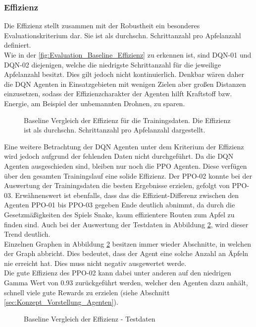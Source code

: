 \subsubsection{Effizienz} \label{sec:Evaluation_Effizienz_Baseline}
Die Effizienz stellt zusammen mit der Robustheit ein besonderes Evaluationskriterium dar. Sie ist als durchschn. Schrittanzahl pro Apfelanzahl definiert.\\
Wie in der \autoref{fig:Evaluation_Baseline_Effizienz} zu erkennen ist, sind DQN-01 und DQN-02 diejenigen, welche die niedrigste Schrittanzahl für die jeweilige Apfelanzahl besitzt. Dies gilt jedoch nicht kontinuierlich. Denkbar wären daher die DQN Agenten in Einsatzgebieten mit wenigen Zielen aber großen Distanzen einzusetzen, sodass der Effizienzcharakter der Agenten hilft Kraftstoff bzw. Energie, am Beispiel der unbemannten Drohnen, zu sparen. 
\begin{figure}[H]
	\centering
	
	\caption[Baseline Vergleich der Effizienz für die Trainingsdaten]{Baseline Vergleich der Effizienz für die Trainingsdaten. Die Effizienz ist als durchschn. Schrittanzahl pro Apfelanzahl dargestellt.}
	\label{fig:Evaluation_Baseline_Effizienz}
\end{figure}
Eine weitere Betrachtung der DQN Agenten unter dem Kriterium der Effizienz wird jedoch aufgrund der fehlenden Daten nicht durchgeführt.
Da die DQN Agenten ausgeschieden sind, bleiben nur noch die PPO Agenten. Diese verfügen über den gesamten Trainingslauf eine solide Effizienz.
Der PPO-02 konnte bei der Auswertung der Trainingsdaten die besten Ergebnisse erzielen, gefolgt von PPO-03.
Erwähnenswert ist ebenfalls, dass das die Effizient-Differenz zwischen den Agenten PPO-01 bis PPO-03 gegeben Ende deutlich abnimmt, da durch die Gesetzmäßigkeiten des Spiels Snake, kaum effizientere Routen zum Apfel zu finden sind.
Auch bei der Auswertung der Testdaten in Abbildung \ref{fig:Evaluation_Effizienz2_Baseline}, wird dieser Trend deutlich.\\
Einzelnen Graphen in Abbildung \ref{fig:Evaluation_Effizienz2_Baseline} besitzen immer wieder Abschnitte, in welchen der Graph abbricht. Dies bedeutet, dass der Agent eine solche Anzahl an Äpfeln nie erreicht hat. Dies muss nicht negativ ausgewertet werde.\\
Die gute Effizienz des PPO-02 kann dabei unter anderen auf den niedrigen Gamma Wert von 0.93 zurückgeführt werden, welcher den Agenten dazu anhält, schnell viele gute Rewards zu erzielen (siehe Abschnitt \ref{sec:Konzept_Vorstellung_Agenten}).
\begin{figure}[H]
	\centering
	
	\caption[Baseline Vergleich der Effizienz für die Testdaten]{Baseline Vergleich der Effizienz - Testdaten}
	\label{fig:Evaluation_Effizienz2_Baseline}
\end{figure}

